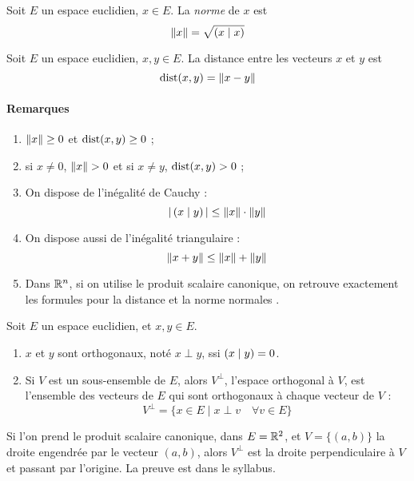 \begin{defn}
Soit $E$ un espace euclidien, $x \in E$. La \emph{norme} de $x$ est
\[ \| x \| = \sqrt{ \left( x \mid x \right)} \]
\end{defn}

\begin{defn}
Soit $E$ un espace euclidien, $x, y \in E$. La distance entre les vecteurs $x$ et $y$ est
\[ \mathrm{dist}(x, y) = \| x-y \| \]
\end{defn}

\paragraph{Remarques}
\begin{enumerate}
\item $\| x \| \geq 0$ et $\mathrm{dist}(x, y) \ge 0$ ;
\item si $x \neq 0$, $\| x \| > 0$ et si $x \neq y$, $\mathrm{dist}(x, y) > 0$ ;
\item On dispose de l'inégalité de Cauchy :
\[ | \left( x \mid y \right) | \leq \| x \| \cdot \| y \| \]
\item On dispose aussi de l'inégalité triangulaire :
\[ \| x + y \| \leq \| x \| + \| y \| \]
\item Dans $\mathbb{R}^n$, si on utilise le produit scalaire canonique, on retrouve exactement les formules pour la distance et la norme \og normales \fg{}.
\end{enumerate}

\begin{defn}
Soit $E$ un espace euclidien, et $x, y \in E$.
\begin{enumerate}
\item $x$ et $y$ sont orthogonaux, noté $x \perp y$, ssi $\left( x \mid y \right) = 0$.
\item Si $V$ est un sous-ensemble de $E$, alors $V^{\perp}$, l'espace orthogonal à $V$, est l'ensemble des vecteurs de $E$ qui sont orthogonaux à chaque vecteur de $V$ :
\[V^\perp = \{ x \in E \mid x \perp v \quad \forall v \in E \} \]
\end{enumerate}
\end{defn}

\begin{exemple}
Si l'on prend le produit scalaire canonique, dans $E=\mathbb{R}^2$, et $V=\{ (a, b)\}$ la droite engendrée par le vecteur $(a, b)$, alors $V^{\perp}$ est la droite perpendiculaire à $V$ et passant par l'origine. La preuve est dans le syllabus.
\end{exemple}

